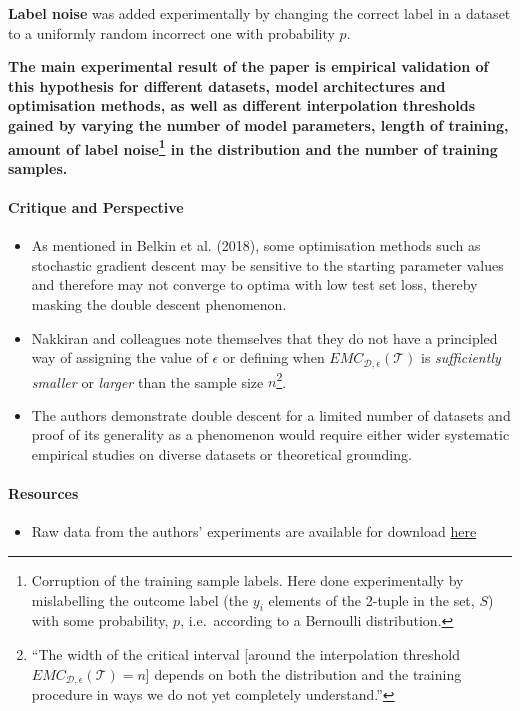 \documentclass[]{article}
\providecommand{\tightlist}{%
  \setlength{\itemsep}{0pt}\setlength{\parskip}{0pt}}
\let\oldparagraph\paragraph
\renewcommand{\paragraph}[1]{\oldparagraph{#1}\mbox{}}
\begin{document}
\textbf{Label noise} was added experimentally by changing the correct
label in a dataset to a uniformly random incorrect one with probability
\(p\).

\textbf{The main experimental result of the paper is empirical
validation of this hypothesis for different datasets, model
architectures and optimisation methods, as well as different
interpolation thresholds gained by varying the number of model
parameters, length of training, amount of label noise\footnote{Corruption
  of the training sample labels. Here done experimentally by
  mislabelling the outcome label (the \(y_i\) elements of the 2-tuple in
  the set, \(S\)) with some probability, \(p\), i.e.~according to a
  Bernoulli distribution.} in the distribution and the number of
training samples.}

\hypertarget{critique-and-perspective}{%
\paragraph{Critique and Perspective}\label{critique-and-perspective}}

\begin{itemize}
\tightlist
\item
  As mentioned in Belkin et al. (2018), some optimisation methods such
  as stochastic gradient descent may be sensitive to the starting
  parameter values and therefore may not converge to optima with low
  test set loss, thereby masking the double descent phenomenon.
\item
  Nakkiran and colleagues note themselves that they do not have a
  principled way of assigning the value of \(\epsilon\) or defining when
  \(EMC_{\mathcal{D}, \epsilon}(\mathcal{T})\) is \emph{sufficiently
  smaller} or \emph{larger} than the sample size \(n\)\footnote{``The
    width of the critical interval {[}around the interpolation threshold
    \(EMC_{\mathcal{D}, \epsilon}(\mathcal{T}) = n\){]} depends on both
    the distribution and the training procedure in ways we do not yet
    completely understand.''}.\\
\item
  The authors demonstrate double descent for a limited number of
  datasets and proof of its generality as a phenomenon would require
  either wider systematic empirical studies on diverse datasets or
  theoretical grounding.
\end{itemize}

\hypertarget{resources}{%
\paragraph{Resources}\label{resources}}

\begin{itemize}
\tightlist
\item
  Raw data from the authors' experiments are available for download
  \href{https://gitlab.com/harvard-machine-learning/double-descent/tree/master}{here}
\end{itemize}
\end{document}
